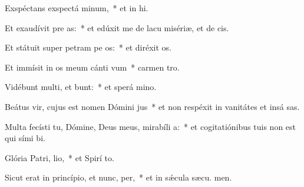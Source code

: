 \item Exspéctans exspectá minum,~* et in hi.
\item Et exaudívit pre as:~* et edúxit me de lacu misériæ, et de  cis.
\item Et státuit super petram pe os:~* et diréxit  os.
\item Et immísit in os meum cánti vum~* carmen  tro.
\item Vidébunt multi, et bunt:~* et sperá  mino.
\item Beátus vir, cujus est nomen Dómini  jus~* et non respéxit in vanitátes et insá sas.
\item Multa fecísti tu, Dómine, Deus meus, mirabíli a:~* et cogitatiónibus tuis non est qui sími  bi.
\item Glória Patri,  lio,~* et Spirí to.
\item Sicut erat in princípio, et nunc,  per,~* et in sǽcula sæcu. men.
